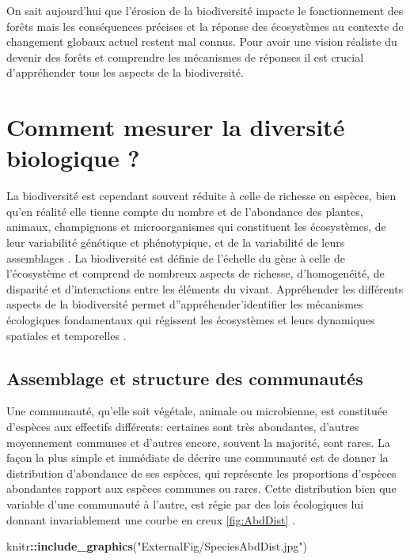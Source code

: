 \documentclass[
  11pt,
  french,
  A4paper,
  extrafontsizes,onecolumn,openright
  ]{memoir}
\newenvironment{Shaded}{\begin{snugshade}}{\end{snugshade}}
\newcommand{\KeywordTok}[1]{\textcolor[rgb]{0.13,0.29,0.53}{\textbf{#1}}}
\newcommand{\StringTok}[1]{\textcolor[rgb]{0.31,0.60,0.02}{#1}}
\newcommand{\OperatorTok}[1]{\textcolor[rgb]{0.81,0.36,0.00}{\textbf{#1}}}
\newcommand{\NormalTok}[1]{#1}
\begin{document}
On sait aujourd'hui que l'érosion de la biodiversité impacte le
fonctionnement des forêts mais les conséquences précises et la réponse
des écosystèmes au contexte de changement globaux actuel restent mal
connus. Pour avoir une vision réaliste du devenir des forêts et
comprendre les mécanismes de réponses il est crucial d'appréhender tous
les aspects de la biodiversité.

\section{Comment mesurer la diversité biologique
?}\label{comment-mesurer-la-diversite-biologique}

La biodiversité est cependant souvent réduite à celle de richesse en
espèces, bien qu'en réalité elle tienne compte du nombre et de
l'abondance des plantes, animaux, champignons et microorganismes qui
constituent les écosystèmes, de leur variabilité génétique et
phénotypique, et de la variabilité de leurs assemblages
\autocite{Loreau2005}. La biodiversité est définie de l'échelle du gène
à celle de l'écosystème et comprend de nombreux aspects de richesse,
d'homogenéité, de disparité et d'interactions entre les éléments du
vivant. Appréhender les différents aspects de la biodiversité permet
d''appréhender'identifier les mécanismes écologiques fondamentaux qui
régissent les écosystèmes et leurs dynamiques spatiales et temporelles
\autocites{Purvis2000}{Loreau2005}.

\subsection{Assemblage et structure des
communautés}\label{AbundanceDistribution}

Une communauté, qu'elle soit végétale, animale ou microbienne, est
constituée d'espèces aux effectifs différents: certaines sont très
abondantes, d'autres moyennement communes et d'autres encore, souvent la
majorité, sont rares. La façon la plus simple et immédiate de décrire
une communauté est de donner la distribution d'abondance de ses espèces,
qui représente les proportions d'espèces abondantes rapport aux espèces
communes ou rares. Cette distribution bien que variable d'une communauté
à l'autre, est régie par des lois écologiques lui donnant invariablement
une courbe en creux \ref{fig:AbdDist} \autocite{McGill2007}.

\begin{Shaded}
\begin{Highlighting}[]
\NormalTok{knitr}\OperatorTok{::}\KeywordTok{include_graphics}\NormalTok{(}\StringTok{"ExternalFig/SpeciesAbdDist.jpg"}\NormalTok{)}
\end{Highlighting}
\end{Shaded}
\end{document}
